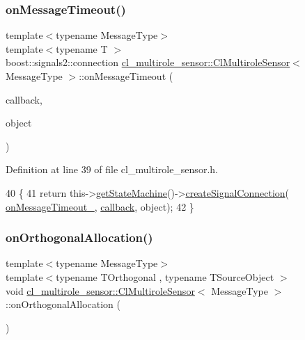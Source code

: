 \subsubsection{\texorpdfstring{on\+Message\+Timeout()}{onMessageTimeout()}}
{\footnotesize\ttfamily template$<$typename Message\+Type$>$ \\
template$<$typename T $>$ \\
boost\+::signals2\+::connection \hyperlink{classcl__multirole__sensor_1_1ClMultiroleSensor}{cl\+\_\+multirole\+\_\+sensor\+::\+Cl\+Multirole\+Sensor}$<$ Message\+Type $>$\+::on\+Message\+Timeout (\begin{DoxyParamCaption}\item[{void(T\+::$\ast$)(const ros\+::\+Timer\+Event \&)}]{callback,  }\item[{T $\ast$}]{object }\end{DoxyParamCaption})\hspace{0.3cm}{\ttfamily [inline]}}



Definition at line 39 of file cl\+\_\+multirole\+\_\+sensor.\+h.


\begin{DoxyCode}
40   \{
41     \textcolor{keywordflow}{return} this->\hyperlink{classsmacc_1_1ISmaccClient_aec51d4712404cb9882b86e4c854bb93a}{getStateMachine}()->\hyperlink{classsmacc_1_1ISmaccStateMachine_adf0f42ade0c65cc471960fe2a7c42da2}{createSignalConnection}(
      \hyperlink{classcl__multirole__sensor_1_1ClMultiroleSensor_afd37257b949c421d4f579b47352be95f}{onMessageTimeout\_}, \hyperlink{sm__ridgeback__barrel__search__1_2servers_2opencv__perception__node_2opencv__perception__node_8cpp_a050e697bd654facce10ea3f6549669b3}{callback}, \textcolor{keywordtype}{object});
42   \}
\end{DoxyCode}
\mbox{\label{classcl__multirole__sensor_1_1ClMultiroleSensor_a1626a5caea2f4ea03052f70fe0117d83}} 
\subsubsection{\texorpdfstring{on\+Orthogonal\+Allocation()}{onOrthogonalAllocation()}}
{\footnotesize\ttfamily template$<$typename Message\+Type$>$ \\
template$<$typename T\+Orthogonal , typename T\+Source\+Object $>$ \\
void \hyperlink{classcl__multirole__sensor_1_1ClMultiroleSensor}{cl\+\_\+multirole\+\_\+sensor\+::\+Cl\+Multirole\+Sensor}$<$ Message\+Type $>$\+::on\+Orthogonal\+Allocation (\begin{DoxyParamCaption}{ }\end{DoxyParamCaption})\hspace{0.3cm}{\ttfamily [inline]}}



